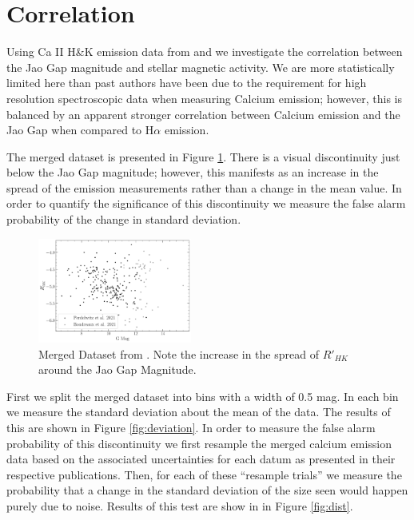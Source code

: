 \section{Correlation}\label{sec:results}
Using Ca II H\&K emission data from \citet{Boudreaux2022} and
\citet{Perdelwitz2021} \citep[quantified using the $R'_{HK}$
metric][]{Middelkoop1982, Rutten1984} we investigate the correlation between
the Jao Gap magnitude and stellar magnetic activity. We are more statistically
limited here than past authors have been due to the requirement for high
resolution spectroscopic data when measuring Calcium emission; however, this is
balanced by an apparent stronger correlation between Calcium emission and the
Jao Gap when compared to H$\alpha$ emission. 

The merged dataset is presented in Figure \ref{fig:mergedData}. There is a
visual discontinuity just below the Jao Gap magnitude; however, this
manifests as an increase in the spread of the emission measurements rather than
a change in the mean value. In order to quantify the significance of this
discontinuity we measure the false alarm probability of the change in standard
deviation.

\begin{figure}
  \centering
  \includegraphics[width=0.45\textwidth]{Combined.pdf}
  \caption{Merged Dataset from \citet{Perdelwitz2021, Boudreaux2022}. Note the
  increase in the spread of $R'_{HK}$ around the Jao Gap Magnitude.}
  \label{fig:mergedData}
\end{figure}

First we split the merged dataset into bins with a width of 0.5 mag. In each bin we
measure the standard deviation about the mean of the data. The results of this
are shown in Figure \ref{fig:deviation}. In order to measure the false alarm
probability of this discontinuity we first resample the merged calcium
emission data based on the associated uncertainties for each datum as
presented in their respective publications. Then, for each of these ``resample
trials'' we measure the probability that a change in the standard deviation of
the size seen would happen purely due to noise. Results of this test are show in
in Figure \ref{fig:dist}. 

